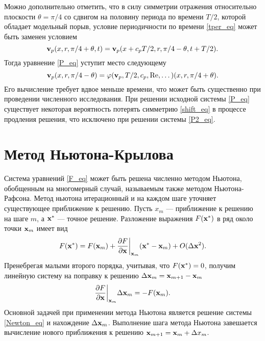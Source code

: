 Можно дополнительно отметить, что в силу симметрии отражения относительно плоскости $\theta = \pi/4$ со сдвигом на половину периода по времени $T/2$, которой обладает модельный порыв, условие периодичности по времени \eqref{tper_eq} может быть заменен условием
\begin{equation}\label{shift_eq}
\mathbf{v}_p(x,r,\pi/4 + \theta,t) = \mathbf{v}_p(x + c_p T/2,r,\pi/4 - \theta,t+T/2).
\end{equation}
Тогда уравнение \eqref{P_eq} уступит место следующему
\begin{equation}\label{P2_eq}
\mathbf{v}_p(x,r,\pi/4 - \theta) = \varphi(\mathbf{v}_p, T/2, c_p, \operatorname{Re}, \dots)(x,r,\pi/4 + \theta).
\end{equation}
Его вычисление требует вдвое меньше времени, что может быть существенно при проведении численного исследования. При решении исходной системы \eqref{P_eq} существует некоторая вероятность потерять симметрию \eqref{shift_eq} в процессе продления решения, что исключено при решении системы \eqref{P2_eq}.

\section{Метод Ньютона-Крылова}

Система уравнений \eqref{F_eq} может быть решена численно методом Ньютона, обобщенным на многомерный случай, называемым также методом Ньютона-Рафсона. Метод ньютона итерационный и на каждом шаге уточняет существующее приближение к решению. Пусть $x_m$ --- приближение к решению на шаге $m$, а $\mathbf{x}^*$ --- точное решение. Разложение выражения $F(\mathbf{x}^*)$ в ряд около точки $\mathbf{x}_m$ имеет вид
\begin{equation}
F(\mathbf{x}^*) = F(\mathbf{x}_m) + \frac{\partial F}{\partial \mathbf{x}}\bigg|_{\mathbf{x}_m} (\mathbf{x}^* - \mathbf{x}_m) + O(\Delta \mathbf{x}^2). 
\end{equation}
Пренебрегая малыми второго порядка, учитывая, что $F(\mathbf{x}^*) = 0$, получим линейную систему на поправку к решению $\Delta \mathbf{x}_m = \mathbf{x}_{m+1} - \mathbf{x}_m$
\begin{equation}\label{Newton_eq}
\frac{\partial F}{\partial \mathbf{x}}\bigg|_{\mathbf{x}_m} \Delta \mathbf{x}_m = - F(\mathbf{x}_m). 
\end{equation}
Основной задачей при применении метода Ньютона является решение системы \eqref{Newton_eq} и нахождение $\Delta \mathbf{x}_m$. Выполнение шага метода Ньютона завешается вычисление нового приближения к решению $\mathbf{x}_{m+1} = \mathbf{x}_m + \Delta x_m$. 


